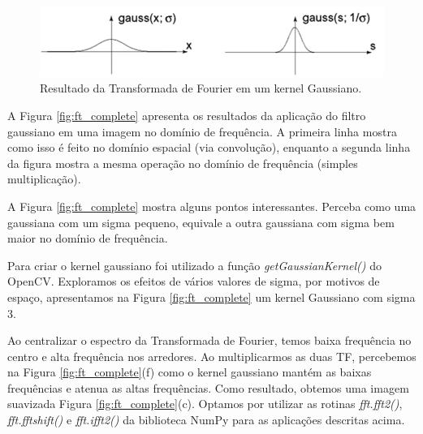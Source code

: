 \documentclass[10pt,twocolumn,letterpaper]{article}
\begin{document}
\begin{figure}
\begin{center}
	\includegraphics[width=0.99\columnwidth]{pics/ft_gaussian}
	\caption{Resultado da Transformada de Fourier em um kernel Gaussiano.\label{fig:ft_gaussian}}   
\end{center} 
\end{figure} 

A Figura \ref{fig:ft_complete} apresenta os resultados da aplicação do filtro gaussiano em uma imagem no domínio de frequência. A primeira linha mostra como isso é feito no domínio espacial (via convolução), enquanto a segunda linha da figura mostra a mesma operação no domínio de frequência (simples multiplicação).

A Figura \ref{fig:ft_complete} mostra alguns pontos interessantes. Perceba como uma gaussiana com um sigma pequeno, equivale a outra gaussiana com sigma bem maior no domínio de frequência. 

Para criar o kernel gaussiano foi utilizado a função \textit{getGaussianKernel()} do OpenCV. Exploramos os efeitos de vários valores de sigma, por motivos de espaço, apresentamos na Figura \ref{fig:ft_complete} um kernel Gaussiano com sigma 3.

Ao centralizar o espectro da Transformada de Fourier, temos baixa frequência no centro e alta frequência nos arredores. Ao multiplicarmos as duas TF, percebemos na Figura \ref{fig:ft_complete}(f) como o kernel gaussiano mantém as baixas frequências e atenua as altas frequências. Como resultado, obtemos uma imagem suavizada Figura \ref{fig:ft_complete}(c). Optamos por utilizar as rotinas \textit{fft.fft2()}, \textit{fft.fftshift()} e \textit{fft.ifft2()} da biblioteca NumPy para as aplicações descritas acima.
\end{document}
